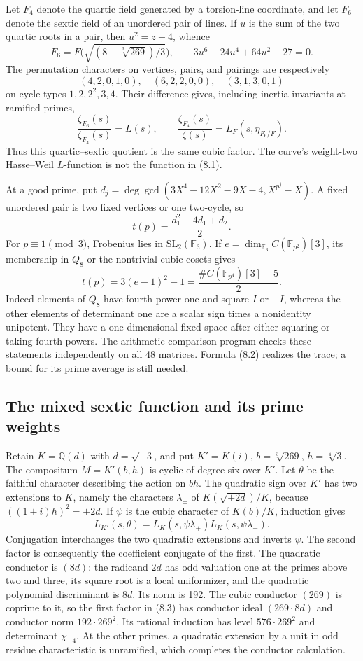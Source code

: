\documentclass[11pt]{article}
\newcommand{\Q}{\mathbb Q}
\begin{document}
Let $F_4$ denote the quartic field generated by a torsion-line coordinate, and let $F_6$ denote the sextic field of an unordered pair of lines. If $u$ is the sum of the two quartic roots in a pair, then $u^2=z+4$, whence
\[
 F_6=F\bigl(\sqrt{(8-\sqrt[3]{269})/3}\bigr),\qquad
 3u^6-24u^4+64u^2-27=0.
\]
The permutation characters on vertices, pairs, and pairings are respectively
\[
 (4,2,0,1,0),\quad(6,2,2,0,0),\quad(3,1,3,0,1)
\]
on cycle types $1,2,2^2,3,4$. Their difference gives, including inertia invariants at ramified primes,
\[
 \frac{\zeta_{F_6}(s)}{\zeta_{F_4}(s)}=L(s),\qquad
 \frac{\zeta_{F_4}(s)}{\zeta(s)}=L_F(s,\eta_{F_6/F}).
 \tag{8.1}
\]
Thus this quartic--sextic quotient is the same cubic factor. The curve's weight-two Hasse--Weil $L$-function is not the function in (8.1).

At a good prime, put $d_j=\deg\gcd(3X^4-12X^2-9X-4,X^{p^j}-X)$. A fixed unordered pair is two fixed vertices or one two-cycle, so
\[
 t(p)=\frac{d_1^2-4d_1+d_2}{2}.
\]
For $p\equiv1\pmod3$, Frobenius lies in $\mathrm{SL}_2(\mathbb F_3)$. If $e=\dim_{\mathbb F_3}C(\mathbb F_{p^2})[3]$, its membership in $Q_8$ or the nontrivial cubic cosets gives
\[
 t(p)=3(e-1)^2-1=\frac{\#C(\mathbb F_{p^4})[3]-5}{2}.
 \tag{8.2}
\]
Indeed elements of $Q_8$ have fourth power one and square $I$ or $-I$, whereas the other elements of determinant one are a scalar sign times a nonidentity unipotent. They have a one-dimensional fixed space after either squaring or taking fourth powers. The arithmetic comparison program checks these statements independently on all 48 matrices. Formula (8.2) realizes the trace; a bound for its prime average is still needed.

\subsection{The mixed sextic function and its prime weights}
Retain $K=\Q(d)$ with $d=\sqrt{-3}$, and put $K'=K(i)$, $b=\sqrt[3]{269}$, $h=\sqrt[4]3$. The compositum $M=K'(b,h)$ is cyclic of degree six over $K'$. Let $\theta$ be the faithful character describing the action on $bh$. The quadratic sign over $K'$ has two extensions to $K$, namely the characters $\lambda_\pm$ of $K(\sqrt{\pm2d})/K$, because $((1\pm i)h)^2=\pm2d$. If $\psi$ is the cubic character of $K(b)/K$, induction gives
\[
 L_{K'}(s,\theta)=L_K(s,\psi\lambda_+)L_K(s,\psi\lambda_-).
 \tag{8.3}
\]
Conjugation interchanges the two quadratic extensions and inverts $\psi$. The second factor is consequently the coefficient conjugate of the first. The quadratic conductor is $(8d)$: the radicand $2d$ has odd valuation one at the primes above two and three, its square root is a local uniformizer, and the quadratic polynomial discriminant is $8d$. Its norm is 192. The cubic conductor $(269)$ is coprime to it, so the first factor in (8.3) has conductor ideal $(269\cdot8d)$ and conductor norm $192\cdot269^2$. Its rational induction has level $576\cdot269^2$ and determinant $\chi_{-4}$. At the other primes, a quadratic extension by a unit in odd residue characteristic is unramified, which completes the conductor calculation.
\end{document}
